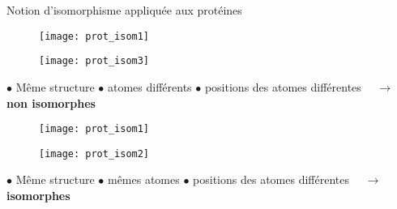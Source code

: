 \begin{frame}{Notion d'isomorphisme appliquée aux protéines}
    \small
    \begin{multicols}{3}
        \begin{figure}[!htb]
            \centering
            \texttt{[image: prot\_isom1]}
        \end{figure}
        \begin{figure}[!htb]
            \centering
            \texttt{[image: prot\_isom3]}
        \end{figure}
        $\bullet$ Même structure 
        \newline $\bullet$ atomes différents
        \newline $\bullet$ positions des atomes différentes 
        \newline $\quad \rightarrow\ $ \textbf{non isomorphes}
    \end{multicols}
    \begin{multicols}{3}
        \begin{figure}[!htb]
            \centering
            \texttt{[image: prot\_isom1]}
        \end{figure}
        \begin{figure}[!htb]
            \centering
            \texttt{[image: prot\_isom2]}
        \end{figure}
        $\bullet$ Même structure 
        \newline $\bullet$ mêmes atomes
        \newline $\bullet$ positions des atomes différentes
        \newline $\quad \rightarrow\ $ \textbf{isomorphes}
    \end{multicols}
\end{frame}

